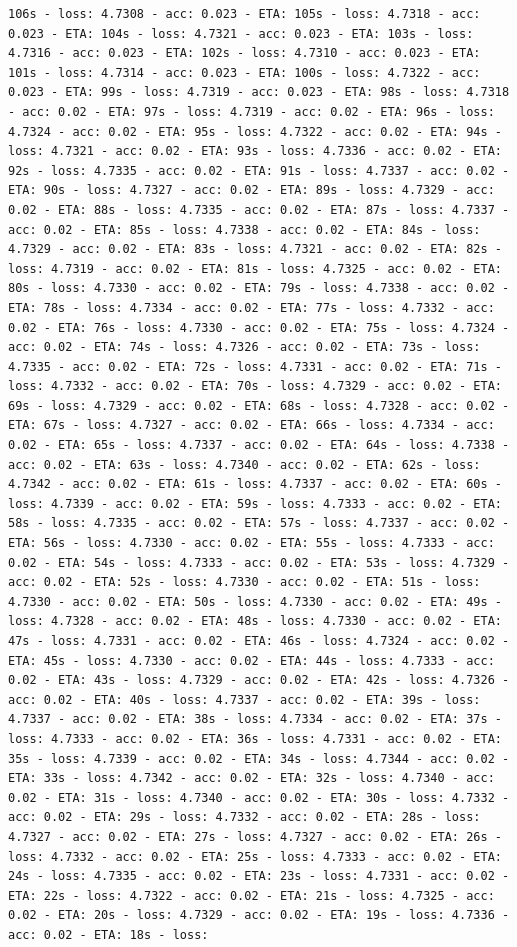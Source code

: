 \documentclass[11pt]{article}
\begin{document}
\begin{Verbatim}[commandchars=\\\{\}]
106s - loss: 4.7308 - acc: 0.023 - ETA: 105s - loss: 4.7318 - acc: 0.023 - ETA: 104s - loss: 4.7321 - acc: 0.023 - ETA: 103s - loss: 4.7316 - acc: 0.023 - ETA: 102s - loss: 4.7310 - acc: 0.023 - ETA: 101s - loss: 4.7314 - acc: 0.023 - ETA: 100s - loss: 4.7322 - acc: 0.023 - ETA: 99s - loss: 4.7319 - acc: 0.023 - ETA: 98s - loss: 4.7318 - acc: 0.02 - ETA: 97s - loss: 4.7319 - acc: 0.02 - ETA: 96s - loss: 4.7324 - acc: 0.02 - ETA: 95s - loss: 4.7322 - acc: 0.02 - ETA: 94s - loss: 4.7321 - acc: 0.02 - ETA: 93s - loss: 4.7336 - acc: 0.02 - ETA: 92s - loss: 4.7335 - acc: 0.02 - ETA: 91s - loss: 4.7337 - acc: 0.02 - ETA: 90s - loss: 4.7327 - acc: 0.02 - ETA: 89s - loss: 4.7329 - acc: 0.02 - ETA: 88s - loss: 4.7335 - acc: 0.02 - ETA: 87s - loss: 4.7337 - acc: 0.02 - ETA: 85s - loss: 4.7338 - acc: 0.02 - ETA: 84s - loss: 4.7329 - acc: 0.02 - ETA: 83s - loss: 4.7321 - acc: 0.02 - ETA: 82s - loss: 4.7319 - acc: 0.02 - ETA: 81s - loss: 4.7325 - acc: 0.02 - ETA: 80s - loss: 4.7330 - acc: 0.02 - ETA: 79s - loss: 4.7338 - acc: 0.02 - ETA: 78s - loss: 4.7334 - acc: 0.02 - ETA: 77s - loss: 4.7332 - acc: 0.02 - ETA: 76s - loss: 4.7330 - acc: 0.02 - ETA: 75s - loss: 4.7324 - acc: 0.02 - ETA: 74s - loss: 4.7326 - acc: 0.02 - ETA: 73s - loss: 4.7335 - acc: 0.02 - ETA: 72s - loss: 4.7331 - acc: 0.02 - ETA: 71s - loss: 4.7332 - acc: 0.02 - ETA: 70s - loss: 4.7329 - acc: 0.02 - ETA: 69s - loss: 4.7329 - acc: 0.02 - ETA: 68s - loss: 4.7328 - acc: 0.02 - ETA: 67s - loss: 4.7327 - acc: 0.02 - ETA: 66s - loss: 4.7334 - acc: 0.02 - ETA: 65s - loss: 4.7337 - acc: 0.02 - ETA: 64s - loss: 4.7338 - acc: 0.02 - ETA: 63s - loss: 4.7340 - acc: 0.02 - ETA: 62s - loss: 4.7342 - acc: 0.02 - ETA: 61s - loss: 4.7337 - acc: 0.02 - ETA: 60s - loss: 4.7339 - acc: 0.02 - ETA: 59s - loss: 4.7333 - acc: 0.02 - ETA: 58s - loss: 4.7335 - acc: 0.02 - ETA: 57s - loss: 4.7337 - acc: 0.02 - ETA: 56s - loss: 4.7330 - acc: 0.02 - ETA: 55s - loss: 4.7333 - acc: 0.02 - ETA: 54s - loss: 4.7333 - acc: 0.02 - ETA: 53s - loss: 4.7329 - acc: 0.02 - ETA: 52s - loss: 4.7330 - acc: 0.02 - ETA: 51s - loss: 4.7330 - acc: 0.02 - ETA: 50s - loss: 4.7330 - acc: 0.02 - ETA: 49s - loss: 4.7328 - acc: 0.02 - ETA: 48s - loss: 4.7330 - acc: 0.02 - ETA: 47s - loss: 4.7331 - acc: 0.02 - ETA: 46s - loss: 4.7324 - acc: 0.02 - ETA: 45s - loss: 4.7330 - acc: 0.02 - ETA: 44s - loss: 4.7333 - acc: 0.02 - ETA: 43s - loss: 4.7329 - acc: 0.02 - ETA: 42s - loss: 4.7326 - acc: 0.02 - ETA: 40s - loss: 4.7337 - acc: 0.02 - ETA: 39s - loss: 4.7337 - acc: 0.02 - ETA: 38s - loss: 4.7334 - acc: 0.02 - ETA: 37s - loss: 4.7333 - acc: 0.02 - ETA: 36s - loss: 4.7331 - acc: 0.02 - ETA: 35s - loss: 4.7339 - acc: 0.02 - ETA: 34s - loss: 4.7344 - acc: 0.02 - ETA: 33s - loss: 4.7342 - acc: 0.02 - ETA: 32s - loss: 4.7340 - acc: 0.02 - ETA: 31s - loss: 4.7340 - acc: 0.02 - ETA: 30s - loss: 4.7332 - acc: 0.02 - ETA: 29s - loss: 4.7332 - acc: 0.02 - ETA: 28s - loss: 4.7327 - acc: 0.02 - ETA: 27s - loss: 4.7327 - acc: 0.02 - ETA: 26s - loss: 4.7332 - acc: 0.02 - ETA: 25s - loss: 4.7333 - acc: 0.02 - ETA: 24s - loss: 4.7335 - acc: 0.02 - ETA: 23s - loss: 4.7331 - acc: 0.02 - ETA: 22s - loss: 4.7322 - acc: 0.02 - ETA: 21s - loss: 4.7325 - acc: 0.02 - ETA: 20s - loss: 4.7329 - acc: 0.02 - ETA: 19s - loss: 4.7336 - acc: 0.02 - ETA: 18s - loss: 
\end{Verbatim}
\end{document}
